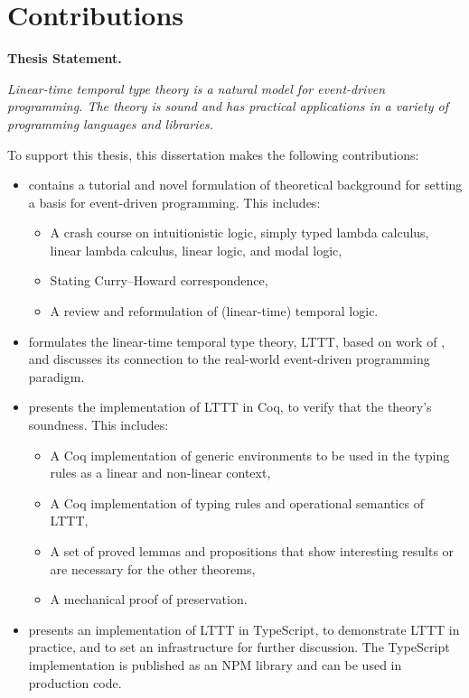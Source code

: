 \section{Contributions}

\textbf{Thesis Statement.}

\textit{Linear-time temporal type theory is a natural model for event-driven programming. The theory is sound and has practical applications in a variety of programming languages and libraries.}

To support this thesis, this dissertation makes the following contributions:

\begin{itemize}
    \item {} contains a tutorial and novel formulation of theoretical background for setting a basis for event-driven programming. This includes:
    \begin{itemize}
        \item A crash course on intuitionistic logic, simply typed lambda calculus, linear lambda calculus, linear logic, and modal logic,
        \item Stating Curry--Howard correspondence,
        \item A review and reformulation of (linear-time) temporal logic.
    \end{itemize}
    \item {} formulates the linear-time temporal type theory, LTTT, based on work of \cite{Paykin2016TheEO}, and discusses its connection to the real-world event-driven programming paradigm.
    \item {} presents the implementation of LTTT in Coq, to verify that the theory's soundness. This includes:
    \begin{itemize}
        \item A Coq implementation of generic environments to be used in the typing rules as a linear and non-linear context,
        \item A Coq implementation of typing rules and operational semantics of LTTT,
        \item A set of proved lemmas and propositions that show interesting results or are necessary for the other theorems,
        \item A mechanical proof of preservation.
    \end{itemize}
    \item {} presents an implementation of LTTT in TypeScript, to demonstrate LTTT in practice, and to set an infrastructure for further discussion. The TypeScript implementation is published as an NPM library and can be used in production code.
\end{itemize}